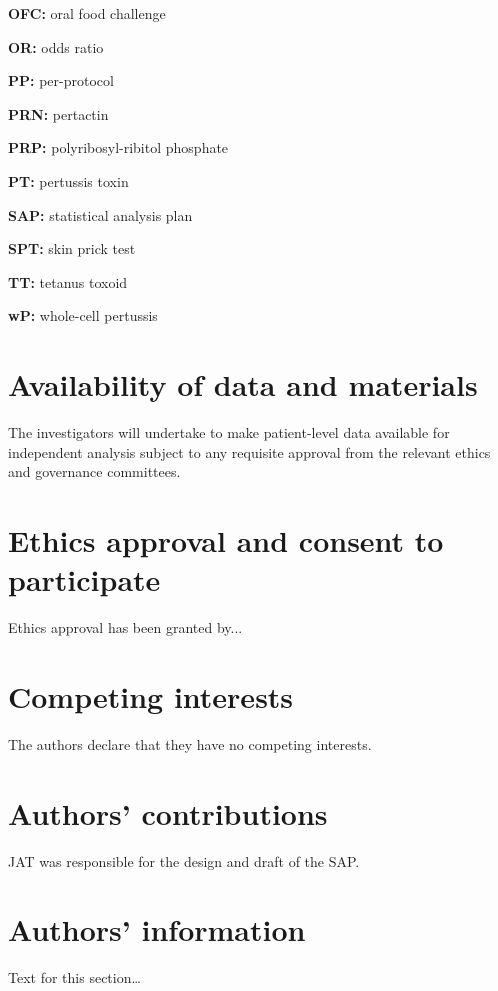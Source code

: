 \documentclass{bmcart}
\begin{document}
\begin{backmatter}
\textbf{OFC:} oral food challenge

\textbf{OR:} odds ratio

\textbf{PP:} per-protocol

\textbf{PRN:} pertactin

\textbf{PRP:} polyribosyl-ribitol phosphate

\textbf{PT:} pertussis toxin

\textbf{SAP:} statistical analysis plan

\textbf{SPT:} skin prick test

\textbf{TT:} tetanus toxoid

\textbf{wP:} whole-cell pertussis

\section*{Availability of data and materials}%
The investigators will undertake to make patient-level data available for independent analysis subject to any requisite approval from the relevant ethics and governance committees.

\section*{Ethics approval and consent to participate}%
Ethics approval has been granted by...

\section*{Competing interests}
The authors declare that they have no competing interests.

\section*{Authors' contributions}
JAT was responsible for the design and draft of the SAP.

\section*{Authors' information}%
Text for this section\ldots



\end{backmatter}
\end{document}
